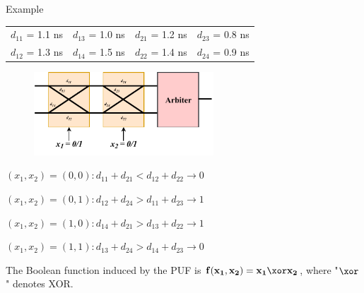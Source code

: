 \documentclass[10pt, compress]{beamer}
\begin{document}
\begin{frame}{Example}
    \vspace*{-0.25cm}
    \begin{table}[H]
        \centering
        \begin{tabular}{cccc}
        $d_{11}$ = 1.1 ns & $d_{13}$ = 1.0 ns & $d_{21}$ = 1.2 ns & $d_{23}$ = 0.8 ns\\
        $d_{12}$ = 1.3 ns & $d_{14}$ = 1.5 ns & $d_{22}$ = 1.4 ns & $d_{24}$ = 0.9 ns\\
        \end{tabular}
    \end{table}
    \vspace{-0.5cm}
    
    \begin{figure}
        \centering
        \includegraphics[width=0.6\textwidth]{figures/2_switch_blocks_paths.pdf}
    \end{figure}

    \begin{figure}
        \begin{flushright}
        \vspace{-1cm}
        
        \end{flushright}
    \end{figure}
    
    \vspace{-0.5cm}
    
    $(x_1,x_2) = (0,0) : d_{11}+d_{21} < d_{12}+d_{22} \to 0$
        
    $(x_1,x_2) = (0,1) : d_{12}+d_{24} > d_{11}+d_{23} \to 1$
        
    $(x_1,x_2) = (1,0) : d_{14}+d_{21} > d_{13}+d_{22} \to 1$
        
    $(x_1,x_2) = (1,1) : d_{13}+d_{24} > d_{14}+d_{23} \to 0$
    
    \vspace{0.5cm}
    
     The Boolean function induced by the PUF is $\mathbf{f(x_1, x_2) = x_1 \xor x_2}$, where "$\xor$" denotes XOR.
\end{frame}
\end{document}
